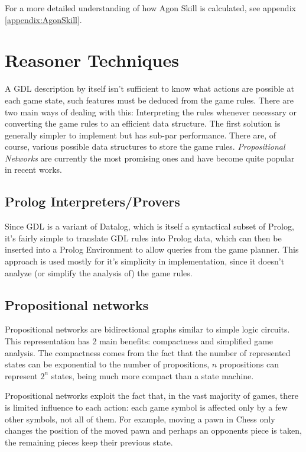 For a more detailed understanding of how Agon Skill is calculated, see appendix \ref{appendix:AgonSkill}. 


\section{Reasoner Techniques}
A \gls{GDL} description by itself isn't sufficient to know what actions are possible at each game state, such features must be deduced from the game rules.
There are two main ways of dealing with this:
Interpreting the rules whenever necessary or converting the game rules to an efficient data structure. The first solution is generally simpler to implement but has sub-par performance. There are, of course, various possible data structures to store the game rules. \textit{Propositional Networks} are currently the most promising ones and have become quite popular in recent works.


\subsection{Prolog Interpreters/Provers}

Since \gls{GDL} is a variant of Datalog, which is itself a syntactical subset of Prolog, it's fairly simple to translate GDL rules into Prolog data, which can then be inserted into a Prolog Environment to allow queries from the game planner.
This approach is used mostly for it's simplicity in implementation, since it doesn't analyze (or simplify the analysis of) the game rules.


\subsection{Propositional networks}

Propositional networks are bidirectional graphs similar to simple logic circuits.
This representation has 2 main benefits: compactness and simplified game analysis.
The compactness comes from the fact that the number of represented states can be exponential to the number of propositions, $n$ propositions can represent $2^{n}$ states, being much more compact than a state machine.

Propositional networks exploit the fact that, in the vast majority of games, there is limited influence to each action: each game symbol is affected only by a few other symbols, not all of them. For example, moving a pawn in Chess only changes the position of the moved pawn and perhaps an opponents piece is taken, the remaining pieces keep their previous state.

